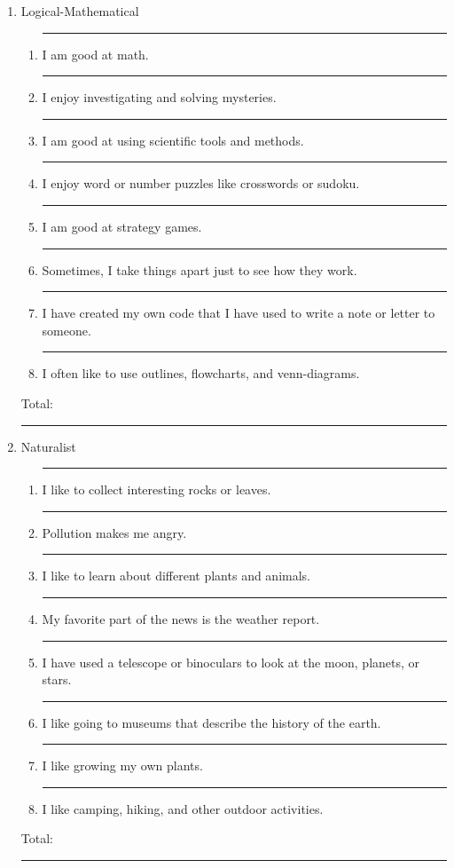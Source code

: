 \documentclass[letterpaper, 10pt]{article}
\begin{document}
\begin{enumerate}
\item Logical-Mathematical
	\begin{enumerate}
	\item \rule{.5in}{.01in} I am good at math.
	\item \rule{.5in}{.01in} I enjoy investigating and solving mysteries.
	\item \rule{.5in}{.01in} I am good at using scientific tools and methods.
	\item \rule{.5in}{.01in} I enjoy word or number puzzles like crosswords or sudoku.
	\item \rule{.5in}{.01in} I am good at strategy games.
	\item \rule{.5in}{.01in} Sometimes, I take things apart just to see how they work.
	\item \rule{.5in}{.01in} I have created my own code that I have used to write a note or letter to someone. 
	\item \rule{.5in}{.01in} I often like to use outlines, flowcharts, and venn-diagrams.
\end{enumerate}
Total:  \rule{.5in}{.01in}

\item Naturalist
	\begin{enumerate}
	\item \rule{.5in}{.01in} I like to collect interesting rocks or leaves. 
	\item \rule{.5in}{.01in} Pollution makes me angry.
	\item \rule{.5in}{.01in} I like to learn about different plants and animals.
	\item \rule{.5in}{.01in} My favorite part of the news is the weather report.
	\item \rule{.5in}{.01in} I have used a telescope or binoculars to look at the moon, planets, or stars. 
	\item \rule{.5in}{.01in} I like going to museums that describe the history of the earth.  
	\item \rule{.5in}{.01in} I like growing my own plants.
	\item \rule{.5in}{.01in} I like camping, hiking, and other outdoor activities.
\end{enumerate}
Total:  \rule{.5in}{.01in}


	
\end{enumerate}
 
\end{document}
